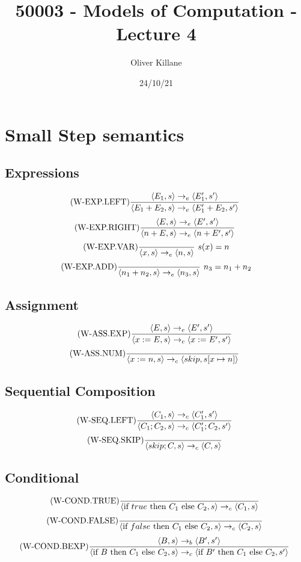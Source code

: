 \documentclass{report}
\title{50003 - Models of Computation - Lecture 4}
\author{Oliver Killane}
\date{24/10/21}
\begin{document}
    \maketitle

    \section*{Small Step semantics}
        \subsection*{Expressions}
            \[\text{(W-EXP.LEFT)}\dfrac{
                \langle E_1, s \rangle \to_e \langle E_1', s' \rangle
                }{\langle E_1 + E_2, s \rangle \to_e \langle E_1' + E_2, s' \rangle} \ \]
            \[\text{(W-EXP.RIGHT)}\dfrac{
                \langle E, s \rangle \to_e \langle E', s' \rangle
                }{\langle n + E, s \rangle \to_e \langle n + E', s' \rangle} \ \]
            \[\text{(W-EXP.VAR)}\dfrac{}{\langle x, s \rangle \to_e \langle n, s \rangle} \ s(x) = n\]
            \[\text{(W-EXP.ADD)}\dfrac{}{\langle n_1 + n_2, s \rangle \to_e \langle n_3, s \rangle} \ n_3 = n_1 + n_2\]
        \subsection*{Assignment}
            \[\text{(W-ASS.EXP)}\dfrac{\langle E, s \rangle \to_e \langle E', s' \rangle}{
                \langle x := E, s \rangle \to_c \langle x := E', s' \rangle
            } \ \]
            \[\text{(W-ASS.NUM)}\dfrac{}{
                \langle x:= n, s \rangle \to_c \langle skip, s[x \mapsto n] \rangle
            } \ \]
        \subsection*{Sequential Composition}
            \[\text{(W-SEQ.LEFT)}\dfrac{\langle C_1, s \rangle \to_c \langle C_1', s' \rangle}{
                \langle C_1;C_2, s \rangle \to_c \langle C_1';C_2, s' \rangle
            } \ \]
            \[\text{(W-SEQ.SKIP)}\dfrac{}{
                \langle skip;C, s \rangle \to_c \langle C, s \rangle
            } \ \]
        \subsection*{Conditional}
            \[\text{(W-COND.TRUE)}\dfrac{}{\langle \text{if } true \text{ then } C_1 \text{ else } C_2, s \rangle \to_c \langle C_1, s \rangle} \ \]
            \[\text{(W-COND.FALSE)}\dfrac{}{\langle \text{if } false \text{ then } C_1 \text{ else } C_2, s \rangle \to_c \langle C_2, s \rangle} \ \]
            \[\text{(W-COND.BEXP)}\dfrac{
                \langle B, s \rangle \to_b \langle B', s' \rangle
            }{\langle \text{if } B \text{ then } C_1 \text{ else } C_2, s \rangle \to_c \langle \text{if } B' \text{ then } C_1 \text{ else } C_2, s' \rangle} \ \]
\end{document}
